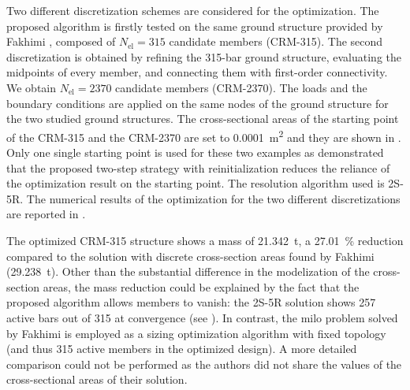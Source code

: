     Two different discretization schemes are considered for the optimization. The proposed algorithm is firstly tested on the same ground structure provided by Fakhimi \etal {}, composed of $N_{\text{el}}=315$ candidate members (CRM-315). The second discretization is obtained by refining the 315-bar ground structure, evaluating the midpoints of every member, and connecting them with first-order connectivity. We obtain $N_{\text{el}}=2370$ candidate members (CRM-2370). The loads and the boundary conditions are applied on the same nodes of the ground structure for the two studied ground structures. The cross-sectional areas of the starting point of the CRM-315 and the CRM-2370 are set to \qty{0.0001}{m^2} and they are shown in . Only one single starting point is used for these two examples as  demonstrated that the proposed two-step strategy with reinitialization reduces the reliance of the optimization result on the starting point. The resolution algorithm used is 2S-5R. The numerical results of the optimization for the two different discretizations are reported in . 
    
    The optimized CRM-315 structure shows a mass of \qty{21.342}{\tonne}, a \qty{27.01}{\%} reduction compared to the solution with discrete cross-section areas found by Fakhimi \etal {} (\qty{29.238}{\tonne}). Other than the substantial difference in the modelization of the cross-section areas, the mass reduction could be explained by the fact that the proposed algorithm allows members to vanish: the 2S-5R solution shows 257 active bars out of 315 at convergence (see ). In contrast, the \gls{milo} problem solved by Fakhimi \etal \cite{fakhimi_discrete_2021} is employed as a sizing optimization algorithm with fixed topology (and thus 315 active members in the optimized design). A more detailed comparison could not be performed as the authors did not share the values of the cross-sectional areas of their solution. 
    
